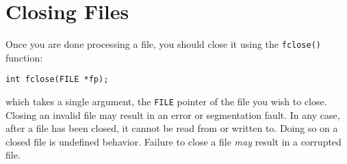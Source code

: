 \section{Closing Files}

Once you are done processing a file, you should close it
using the \texttt{fclose()} function:

\texttt{int fclose(FILE *fp);}

which takes a single argument, the \texttt{FILE}
pointer of the file you wish to close.  Closing an invalid
file may result in an error or segmentation fault.  In any
case, after a file has been closed, it cannot be read from
or written to.  Doing so on a closed file is undefined
behavior. Failure to close a file \emph{may} result in a 
corrupted file. 






